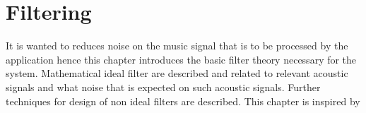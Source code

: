\chapter{Filtering} \label{ch7}
It is wanted to reduces noise on the music signal that is to be processed by the application hence this chapter introduces the basic filter theory necessary for the system. Mathematical ideal filter are described and related to relevant acoustic signals and what noise that is expected on such acoustic signals. Further techniques for design of non ideal filters are described. This chapter is inspired by \cite{DTSP}      

